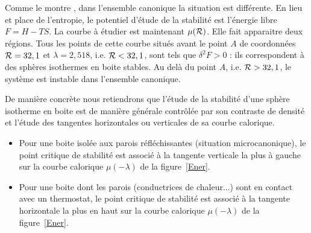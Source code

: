	Comme le montre \cite{2002A&A...381..340C}, dans l'ensemble canonique la situation est différente. En lieu et
	place de l'entropie, le potentiel d'étude de la stabilité est l'énergie libre $F=H-TS$. La courbe à étudier est
	maintenant $\mu(\mathcal{R})$. Elle fait apparaitre deux régions. Tous les points de cette courbe situés avant le point
	$A$ de coordonnées $\mathcal{R}=32,1$ et $\lambda=2,518$, i.e. $\mathcal{R}<32,1$, sont tels que $\delta^2 F>0$ : ils
	correspondent à des sphères isothermes en boite stables. Au delà du point $A$, i.e. $\mathcal{R}>32,1$, le système est
	instable dans l'ensemble canonique.
	
	De manière concrète nous retiendrons que l'étude de la stabilité d'une sphère isotherme en boite est de manière générale contrôlée par son contraste de densité et l'étude des tangentes horizontales ou verticales de sa courbe calorique.   
	\begin{itemize}

		\item Pour une boite isolée aux parois réfléchissantes (situation microcanonique), le point critique de
			stabilité est associé à la tangente verticale la plus à gauche sur la courbe calorique
			$\mu(-\lambda)$ de la figure~\ref{Ener}.

		\item Pour une boite dont les parois (conductrices de chaleur...) sont en contact avec un thermostat, le
			point critique de stabilité est associé à la tangente horizontale la plus en haut sur la courbe
			calorique $\mu(-\lambda)$ de la figure~\ref{Ener}.

	\end{itemize}
	
